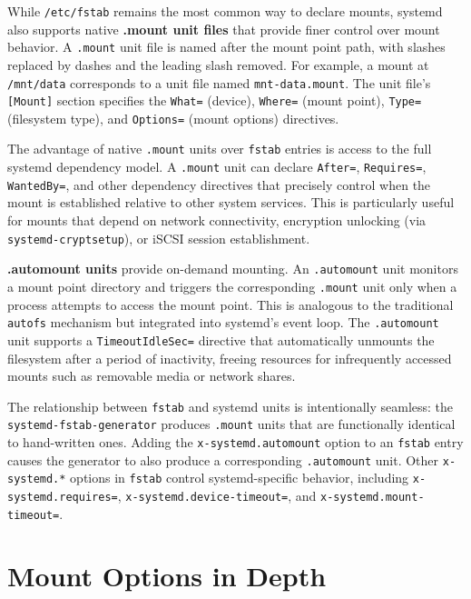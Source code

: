 While \texttt{/etc/fstab} remains the most common way to declare mounts, systemd also supports native \textbf{.mount unit files} that provide finer control over mount behavior. A \texttt{.mount} unit file is named after the mount point path, with slashes replaced by dashes and the leading slash removed. For example, a mount at \texttt{/mnt/data} corresponds to a unit file named \texttt{mnt-data.mount}. The unit file's \texttt{[Mount]} section specifies the \texttt{What=} (device), \texttt{Where=} (mount point), \texttt{Type=} (filesystem type), and \texttt{Options=} (mount options) directives.

The advantage of native \texttt{.mount} units over \texttt{fstab} entries is access to the full systemd dependency model. A \texttt{.mount} unit can declare \texttt{After=}, \texttt{Requires=}, \texttt{WantedBy=}, and other dependency directives that precisely control when the mount is established relative to other system services. This is particularly useful for mounts that depend on network connectivity, encryption unlocking (via \texttt{systemd-cryptsetup}), or iSCSI session establishment.

\textbf{.automount units} provide on-demand mounting. An \texttt{.automount} unit monitors a mount point directory and triggers the corresponding \texttt{.mount} unit only when a process attempts to access the mount point. This is analogous to the traditional \texttt{autofs} mechanism but integrated into systemd's event loop. The \texttt{.automount} unit supports a \texttt{TimeoutIdleSec=} directive that automatically unmounts the filesystem after a period of inactivity, freeing resources for infrequently accessed mounts such as removable media or network shares.

The relationship between \texttt{fstab} and systemd units is intentionally seamless: the \texttt{systemd-fstab-generator} produces \texttt{.mount} units that are functionally identical to hand-written ones. Adding the \texttt{x-systemd.automount} option to an \texttt{fstab} entry causes the generator to also produce a corresponding \texttt{.automount} unit. Other \texttt{x-systemd.*} options in \texttt{fstab} control systemd-specific behavior, including \texttt{x-systemd.requires=}, \texttt{x-systemd.device-timeout=}, and \texttt{x-systemd.mount-timeout=}.

\section{Mount Options in Depth}

